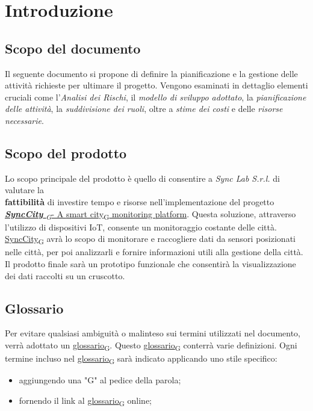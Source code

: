 \section{Introduzione}
\setcounter{subsection}{0}
\subsection{Scopo del documento}
Il seguente documento si propone di definire la pianificazione e la gestione delle attività richieste per ultimare il progetto. Vengono esaminati in dettaglio elementi cruciali come l’\textit{Analisi dei Rischi}, il \textit{modello di sviluppo adottato}, la \textit{pianificazione delle attività}, la \textit{suddivisione dei ruoli}, oltre a \textit{stime dei costi} e delle \textit{risorse necessarie}.

\subsection{Scopo del prodotto}
Lo scopo principale del prodotto è quello di consentire a \textit{Sync Lab S.r.l.} di valutare la \\\textbf{fattibilità} di investire tempo e risorse nell'implementazione del progetto  \href{https://7last.github.io/docs/rtb/documentazione-interna/glossario#synccity}{\textit{\textbf{SyncCity} \textsubscript{G}}- A \href{https://7last.github.io/docs/rtb/documentazione-interna/glossario#smart-city}{smart city\textsubscript{G}} monitoring platform}. Questa soluzione, attraverso l'utilizzo di dispositivi IoT, consente un monitoraggio costante delle città. \href{https://7last.github.io/docs/rtb/documentazione-interna/glossario#synccity}{SyncCity\textsubscript{G}} avrà lo scopo di monitorare e raccogliere dati da sensori posizionati nelle città, per poi analizzarli e fornire informazioni utili alla gestione della città. Il prodotto finale sarà un prototipo funzionale che consentirà la visualizzazione dei dati raccolti su un cruscotto.

\subsection{Glossario}
Per evitare qualsiasi ambiguità o malinteso sui termini utilizzati nel documento, verrà adottato un \href{https://7last.github.io/docs/rtb/documentazione-interna/glossario#glossario}{glossario\textsubscript{G}}. Questo \href{https://7last.github.io/docs/rtb/documentazione-interna/glossario#glossario}{glossario\textsubscript{G}} conterrà varie definizioni. Ogni termine incluso nel \href{https://7last.github.io/docs/rtb/documentazione-interna/glossario#glossario}{glossario\textsubscript{G}} sarà indicato applicando uno stile specifico:
\begin{itemize}
    \item aggiungendo una "G" al pedice della parola;
    \item fornendo il link al \href{https://7last.github.io/docs/rtb/documentazione-interna/glossario#glossario}{glossario\textsubscript{G}} online;
\end{itemize}

